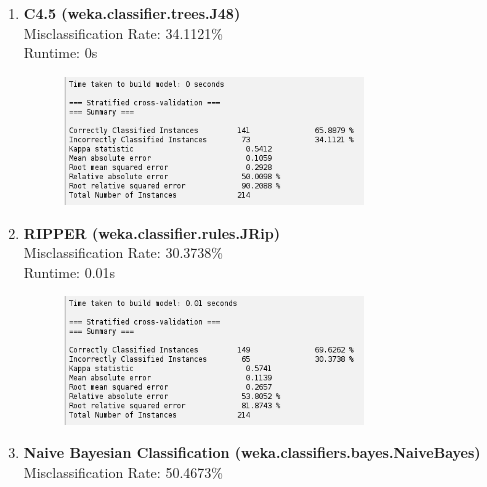\documentclass{article}
\begin{document}
    \begin{enumerate}[label = (\alph*), left=10pt, itemsep=10pt]
        
        \item \begin{minipage}[t]{0.9\textwidth}
            \textbf{C4.5 (weka.classifier.trees.J48)}\\
             Misclassification Rate: 34.1121\%\\
             Runtime: 0s
             \begin{figure}[H]
                \includegraphics[width=0.75\textwidth, height=0.2\textheight]{./82a.png}
            \end{figure}
        \end{minipage}
        \item \begin{minipage}[t]{0.9\textwidth}
            \textbf{RIPPER (weka.classifier.rules.JRip)}\\
             Misclassification Rate: 30.3738\%\\
             Runtime: 0.01s
             \begin{figure}[H]
                \includegraphics[width=0.75\textwidth, height=0.2\textheight]{./82b.png}
            \end{figure}
        \end{minipage}
        \item \begin{minipage}[t]{0.9\textwidth}
            \textbf{Naive Bayesian Classification (weka.classifiers.bayes.NaiveBayes)}\\
             Misclassification Rate: 50.4673\%\\

\end{minipage}
\end{enumerate}
\end{document}
